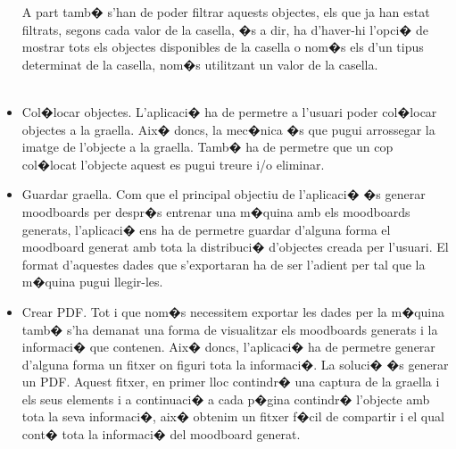 \documentclass[12pt,a4paper,openright,oneside]{article}
\numberwithin{equation}{section}
\theoremstyle{definition}
\begin{document}
\begin{itemize}
A part tamb� s'han de poder filtrar aquests objectes, els que ja han estat filtrats, segons cada valor de la casella, �s a dir, ha d'haver-hi l'opci� de mostrar tots els objectes disponibles de la casella o nom�s els d'un tipus determinat de la casella, nom�s utilitzant un valor de la casella.\\\
\item Col�locar objectes. L'aplicaci� ha de permetre a l'usuari poder col�locar objectes a la graella. Aix� doncs, la mec�nica �s que pugui arrossegar la imatge de l'objecte a la graella. Tamb� ha de permetre que un cop col�locat l'objecte aquest es pugui treure i/o eliminar.
\item Guardar graella. Com que el principal objectiu de l'aplicaci� �s generar moodboards per despr�s entrenar una m�quina amb els moodboards generats, l'aplicaci� ens ha de permetre guardar d'alguna forma el moodboard generat amb tota la distribuci� d'objectes creada per l'usuari. El format d'aquestes dades que s'exportaran ha de ser l'adient per tal que la m�quina pugui llegir-les.
\item Crear PDF. Tot i que nom�s necessitem exportar les dades per la m�quina tamb� s'ha demanat una forma de visualitzar els moodboards generats i la informaci� que contenen. Aix� doncs, l'aplicaci� ha de permetre generar d'alguna forma un fitxer on figuri tota la informaci�. La soluci� �s generar un PDF. Aquest fitxer, en primer lloc contindr� una captura de la graella i els seus elements i a continuaci� a cada p�gina contindr� l'objecte amb tota la seva informaci�, aix� obtenim un fitxer f�cil de compartir i el qual cont� tota la informaci� del moodboard generat.
\end{itemize}
\end{document}
